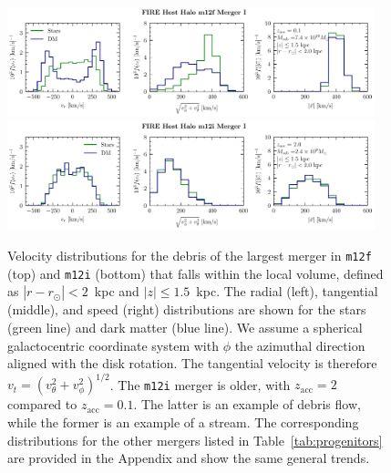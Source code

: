 \documentclass[twocolumn,preprintnumbers]{aastex6}
\DeclareRobustCommand{\Tab}[1]{Table~\ref{#1}}
\newcommand{\zacc}{z_\mathrm{acc}}
\def\ML#1{\textcolor{red}{[ML: #1]}}
\def\lmn#1{\textcolor{blue}{[LN: #1]}}
\newcommand{\mi}{\texttt{m12i}}
\begin{document}

\begin{figure}[tb] %
   \centering
	\includegraphics[width=0.95\textwidth]{plots/star_dm_vr_vt_v_merger_0m12f.pdf} 
	\qquad
	\includegraphics[width=0.95\textwidth]{plots/star_dm_vr_vt_v_merger_0m12i.pdf} 
   \caption{Velocity distributions for the debris of the largest merger in \texttt{m12f} (top) and \texttt{m12i} (bottom) that falls within the local volume, defined as $|r-r_\odot| < 2$~kpc and $|z| \leq 1.5$~kpc.  The radial (left), tangential (middle), and speed (right) distributions are shown for the stars (green line) and dark matter (blue line).  We assume a spherical galactocentric coordinate system with $\phi$ the azimuthal direction aligned with the disk rotation.  The tangential velocity is therefore $v_t = \left( v_\theta^2 + v_\phi^2\right)^{1/2}$.  The \texttt{m12i} merger is older, with $\zacc = 2$ compared to $\zacc = 0.1$.  The latter is an example of debris flow, while the former is an example of a stream.  The corresponding distributions for the other mergers listed in \Tab{tab:progenitors} are provided in the Appendix and show the same general trends. }
   \label{fig:streamdebris}
\end{figure}
\end{document}
